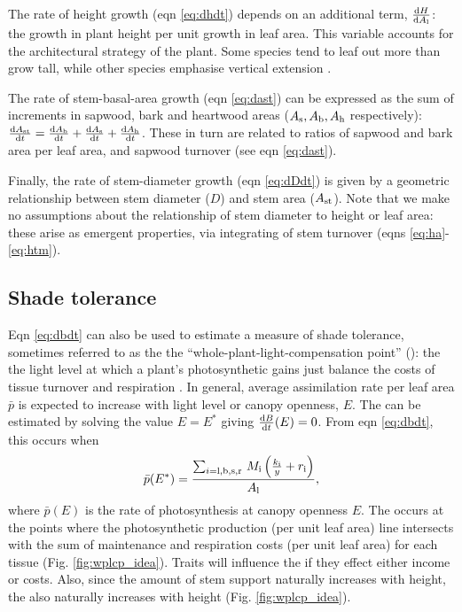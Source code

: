 \documentclass[a4paper,11pt]{article}
\begin{document}
The rate of height growth (eqn \ref{eq:dhdt}) depends on an additional term, $\frac{{\rm d}H }{{\rm d}A_{\rm l}}$: the growth in plant height per unit growth in leaf area. This variable accounts for the architectural strategy of the plant. Some species tend to leaf out more than grow tall, while other species emphasise vertical extension \citep{Poorter-2006}.

The rate of stem-basal-area growth (eqn \ref{eq:dast}) can be expressed as the sum of increments in sapwood, bark and heartwood areas ($A_{\rm s}, A_{\rm b}, A_{\rm h}$ respectively): $\frac{{\rm d}A_{\rm st}}{{\rm d}t}= \frac{{\rm d}A_{\rm b}}{{\rm d}t} + \frac{{\rm d}A_{\rm s}}{{\rm d}t} + \frac{{\rm d}A_{\rm h}}{{\rm d}t}$. These in turn are related to ratios of sapwood and bark area per leaf area, and sapwood turnover (see eqn \ref{eq:dast}).

Finally, the rate of stem-diameter growth (eqn \ref{eq:dDdt}) is given by a geometric relationship between stem diameter ($D$) and stem area ($A_{\rm st}$). Note that we make no assumptions about the relationship of stem diameter to height or leaf area: these arise as emergent properties, via integrating of stem turnover (eqns \ref{eq:ha}- \ref{eq:htm}).

\subsection{Shade tolerance}

Eqn \ref{eq:dbdt} can also be used to estimate a measure of shade tolerance, sometimes referred to as the the ``whole-plant-light-compensation point'' ({\wplcp}): the  the light level at which a plant's photosynthetic gains just balance the costs of tissue turnover and respiration \citep{Givnish-1988, Baltzer-2007, Lusk-2013}. In general, average assimilation rate per leaf area $\bar{p}$ is expected to increase with light level or canopy openness, $E$. The {\wplcp} can be estimated by solving the value $E=E^*$ giving $\frac{{\rm d}B} {{\rm d}t}(E)=0$. From eqn \ref{eq:dbdt}, this occurs when
\begin{equation}\label{eq:wplcp}
\bar{p}(E^*) =\frac{\sum_{i={\rm l,b,s,r}} \, M_{\rm i} \left(\frac{k_{\rm i}}{y} + r_{\rm i}\right)}{A_{\rm l}},
\end{equation}
where $\bar{p}(E)$ is the rate of photosynthesis at canopy openness $E$. The {\wplcp} occurs at the points where the photosynthetic production (per unit leaf area) line intersects with the sum of maintenance and respiration costs (per unit leaf area) for each tissue (Fig. \ref{fig:wplcp_idea}). Traits will influence the {\wplcp} if they effect either income or costs. Also, since the amount of stem support naturally increases with height, the {\wplcp} also naturally increases with height \citep{Givnish-1988} (Fig. \ref{fig:wplcp_idea}).
\end{document}
